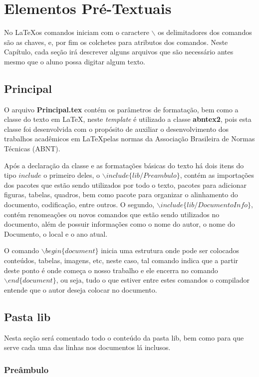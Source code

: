 \chapter{Elementos Pré-Textuais}
    \label{cha:pre-textuais}
        No \LaTeX os comandos iniciam com o caractere $\backslash$ os delimitadores dos comandos são as chaves, e, por fim os colchetes para atributos dos comandos. Neste Capítulo, cada seção irá descrever alguns arquivos que são necessário antes mesmo que o aluno possa digitar algum texto.
        
    \section{Principal}
        \label{sec:principal}
        O arquivo \textbf{Principal.tex} contém os parâmetros de formatação, bem como a classe do texto em \LaTeX, neste \textit{template} é utilizado a classe \textbf{abntex2}, pois esta classe foi desenvolvida com o propósito de auxiliar o desenvolvimento dos trabalhos acadêmicos em \LaTeX pelas normas da Associação Brasileira de Normas Técnicas (ABNT).
        
        Após a declaração da classe e as formatações básicas do texto há dois itens do tipo $include$ o primeiro deles, o $\backslash include\{lib/Preambulo\}$, contém as importações dos pacotes que estão sendo utilizados por todo o texto, pacotes para adicionar figuras, tabelas, quadros, bem como pacote para organizar o alinhamento do documento, codificação, entre outros. O segundo, $\backslash include\{lib/DocumentoInfo\}$, contém renomeações ou novos comandos que estão sendo utilizados no documento, além de possuir informações como o nome do autor, o nome do Documento, o local e o ano atual.
        
        O comando $\backslash begin\{document\}$ inicia uma estrutura onde pode ser colocados conteúdos, tabelas, imagens, etc, neste caso, tal comando indica que a partir deste ponto é onde começa o nosso trabalho e ele encerra no comando $\backslash end\{document\}$, ou seja, tudo o que estiver entre estes comandos o compilador entende que o autor deseja colocar no documento.
        
    \section{Pasta lib}
        \label{sec:source-lib}
        Nesta seção será comentado todo o conteúdo da pasta lib, bem como para que serve cada uma das linhas nos documentos lá inclusos.
        \subsection{Preâmbulo}
            \label{subsec:preambulo}